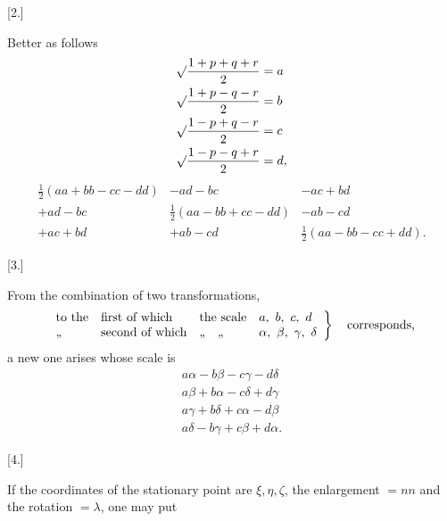 \begin{center}[2.]\end{center}

Better as follows
\[
\begin{aligned}
\mathord{\surd}\frac{1+p+q+r}{2}&=a\\
\mathord{\surd}\frac{1+p-q-r}{2}&=b\\
\mathord{\surd}\frac{1-p+q-r}{2}&=c\\
\mathord{\surd}\frac{1-p-q+r}{2}&=d,
\end{aligned}
\]
\[
\begin{array}{ccc}
\tfrac12(aa+bb-cc-dd)&-ad-bc&-ac+bd\\
+ad-bc&\tfrac12(aa-bb+cc-dd)&-ab-cd\\
+ac+bd&+ab-cd&\tfrac12(aa-bb-cc+dd).
\end{array}
\]

\begin{center}[3.]\end{center}

From the combination of two transformations,
\[
\left.\begin{array}{llll}
\text{to the}&\text{first of which}&\text{the scale}&a,\ b,\ c,\ d\\
\text{,,}&\text{second of which}&\text{,,\quad,,}&\alpha,\ \beta,\ \gamma,\ \delta
\end{array}\right\}\quad\text{corresponds,}
\]
a new one arises whose scale is
\[
\begin{gathered}
a\alpha-b\beta-c\gamma-d\delta\\
a\beta+b\alpha-c\delta+d\gamma\\
a\gamma+b\delta+c\alpha-d\beta\\
a\delta-b\gamma+c\beta+d\alpha.
\end{gathered}
\]

\begin{center}[4.]\end{center}

If the coordinates of the stationary point are $\xi,\eta,\zeta$, the enlargement $=nn$ and the rotation $=\lambda$, one may put
